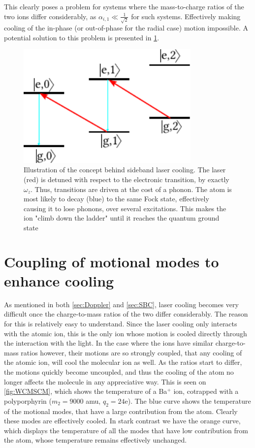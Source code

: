 This clearly poses a problem for systems where the mass-to-charge ratios of the two ions differ considerably, as $\alpha_{i,1}\ll \frac{1}{\sqrt{2}}$ for such systems. Effectively making cooling of the in-phase (or out-of-phase for the radial case) motion impossible. A potential solution to this problem is presented in \cref{sec:Coupling}.

\begin{figure}
    \centering
    \includegraphics[width = 0.8\textwidth]{main/coolingScheme.pdf}
    \caption{Illustration of the concept behind sideband laser cooling. The laser (red) is detuned with respect to the electronic transition, by exactly $\omega_z$. Thus, transitions are driven at the cost of a phonon. The atom is most likely to decay (blue) to the same Fock state, effectively causing it to lose phonons, over several excitations. This makes the ion "climb down the ladder" until it reaches the quantum ground state}
    \label{fig:SBC}
\end{figure}

\section{Coupling of motional modes to enhance cooling}
\label{sec:Coupling}
As mentioned in both \cref{sec:Doppler} and \cref{sec:SBC}, laser cooling becomes very difficult once the charge-to-mass ratios of the two differ considerably. The reason for this is relatively easy to understand.
Since the laser cooling only interacts with the atomic ion, this is the only ion whose motion is cooled directly through the interaction with the light. In the case where the ions have similar charge-to-mass ratios however, their motions are so strongly coupled, that any cooling of the atomic ion, will cool the molecular ion as well.
As the ratios start to differ, the motions quickly become uncoupled, and thus the cooling of the atom no longer affects the molecule in any appreciative way. This is seen on \cref{fig:WCMSCM}, which shows the temperature of a Ba$^+$ ion, cotrapped with a polyporphyrin ($m_2 = 9000$ amu, $q_2 = 24$e). The blue curve shows the temperature of the motional modes, that have a large contribution from the atom. Clearly these modes are effectively cooled. In stark contrast we have the orange curve, which displays the temperature of all the modes that have low contribution from the atom, whose temperature remains effectively unchanged.

